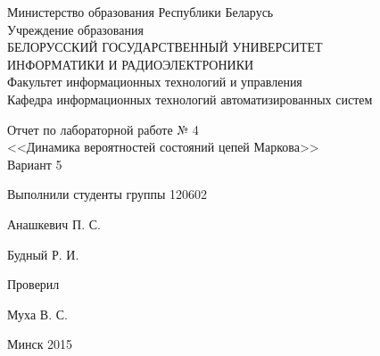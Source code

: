 \thispagestyle{empty}
\setlength{\parindent}{0ex} %

\begin{center}
  Министерство образования Республики Беларусь \\
  \vspace{0.5ex}
  Учреждение образования \\
  БЕЛОРУССКИЙ ГОСУДАРСТВЕННЫЙ УНИВЕРСИТЕТ \\
  ИНФОРМАТИКИ И РАДИОЭЛЕКТРОНИКИ \\
  \vspace{0.5ex}
  Факультет информационных технологий и управления \\
  \vspace{0.5ex}
  Кафедра информационных технологий автоматизированных систем
\end{center}

\vspace{50mm}

\begin{center}
  Отчет по лабораторной работе № 4 \\
  <<Динамика вероятностей состояний цепей Маркова>> \\
  Вариант 5
\end{center}

\vspace{50mm}

\begin{minipage}{.55\linewidth}
    Выполнили студенты группы 120602
    \bigskip
\end{minipage}
\hfill
\begin{minipage}{.4\linewidth}
  \begin{flushright}
    Анашкевич П. С.

    Будный Р. И.
  \end{flushright}
\end{minipage}

\vspace{10mm}

\begin{minipage}{.55\linewidth}
    Проверил
\end{minipage}
\hfill
\begin{minipage}{.4\linewidth}
  \begin{flushright}
    Муха В. С.

  \end{flushright}
\end{minipage}

\vspace{30mm}
\begin{center}
  Минск 2015
\end{center}

\setlength{\parindent}{5ex} %

\newpage
